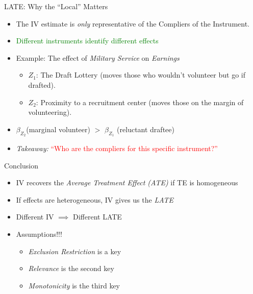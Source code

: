 \documentclass[11pt, handout]{beamer}
\begin{document}
\begin{frame}{LATE: Why the ``Local'' Matters}
    \begin{itemize}[<+->]
        \item The IV estimate is \textit{only} representative of the Compliers of the Instrument.
        \vspace{0.8em}
        \item \textcolor{Green}{Different instruments identify different effects}
        \vspace{0.8em}
        \item Example: The effect of \textit{Military Service} on \textit{Earnings}
        \begin{itemize}
            \item $Z_1$: The Draft Lottery (moves those who wouldn't volunteer but go if drafted).
            \item $Z_2$: Proximity to a recruitment center (moves those on the margin of volunteering).
        \end{itemize}
        \vspace{0.8em}
        \item $\beta_{Z_{2}}$(marginal volunteer) $>$ $\beta_{Z_{1}}$ (reluctant draftee)
        \vspace{0.8em}
        \item \textit{Takeaway:} \textcolor{red}{``Who are the compliers for this specific instrument?''}
    \end{itemize}
\end{frame}

\begin{frame}{Conclusion}
    \begin{itemize}[<+->]
        \item IV recovers the \textit{Average Treatment Effect (ATE)} if TE is homogeneous
        \vspace{0.8em}
        \item If effects are heterogeneous, IV gives us the \textit{LATE}
        \vspace{0.8em}
        \item Different IV $\implies$ Different LATE
        \vspace{0.8em}
        \item Assumptions!!!
            \begin{itemize}
                \item \textit{Exclusion Restriction} is a key
                \vspace{0.8em}
                \item \textit{Relevance} is the second key
                \vspace{0.8em} 
                \item \textit{Monotonicity} is the third key
            \end{itemize}
        \vspace{0.8em}
    \end{itemize}
\end{frame}
\end{document}
